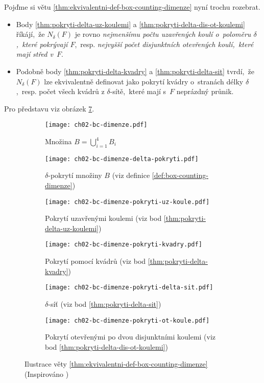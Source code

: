 Pojďme si větu \ref{thm:ekvivalentni-def-box-counting-dimenze} nyní trochu rozebrat.
\begin{itemize}
    \item Body \ref{thm:pokryti-delta-uz-koulemi} a \ref{thm:pokryti-delta-dis-ot-koulemi} říkájí,~že $N_\delta(F)$ je rovno \emph{nejmenšímu počtu uzavřených koulí o~poloměru $\delta$,~které pokrývají $F$},~resp. \emph{nejvyšší počet disjunktních otevřených koulí,~které mají střed v~$F$}.
    \item Podobně body \ref{thm:pokryti-delta-kvadry} a \ref{thm:pokryti-delta-sit} tvrdí,~že $N_\delta(F)$ lze ekvivalentně definovat jako pokrytí kvádry o~stranách délky $\delta$,~resp. počet všech kvádrů z $\delta$-sítě,~které mají s~$F$ neprázdný průnik.
\end{itemize}
Pro představu viz obrázek \ref{fig:ilustrace-definic-bc-dimenze}.
\begin{figure}[h]
    \centering
    \begin{subfigure}{0.4\textwidth}
        \centering
        \texttt{[image: ch02-bc-dimenze.pdf]}
        \caption{Množina $B=\bigcup_{i=1}^4 B_i$}
        \label{subfig:bc-dimenze-pokryvana-mnozina}
    \end{subfigure}
    \qquad
    \begin{subfigure}{0.4\textwidth}
        \centering
        \texttt{[image: ch02-bc-dimenze-delta-pokryti.pdf]}
        \caption{$\delta$-pokrytí množiny $B$ (viz definice \ref{def:box-counting-dimenze})}
        \label{subfig:bc-dimenze-delta-pokryti}
    \end{subfigure}
    \qquad
    \begin{subfigure}{0.4\textwidth}
        \centering
        \texttt{[image: ch02-bc-dimenze-pokryti-uz-koule.pdf]}
        \caption{Pokrytí uzavřenými koulemi (viz bod \ref{thm:pokryti-delta-uz-koulemi})}
        \label{subfig:bc-dimenze-uz-koule}
    \end{subfigure}
    \qquad
    \begin{subfigure}{0.4\textwidth}
        \centering
        \texttt{[image: ch02-bc-dimenze-pokryti-kvadry.pdf]}
        \caption{Pokrytí pomocí kvádrů (viz bod \ref{thm:pokryti-delta-kvadry})}
        \label{subfig:bc-dimenze-kvadry}
    \end{subfigure}
    \qquad
    \begin{subfigure}{0.4\textwidth}
        \centering
        \texttt{[image: ch02-bc-dimenze-pokryti-delta-sit.pdf]}
        \caption{$\delta$-síť (viz bod \ref{thm:pokryti-delta-sit})}
        \label{subfig:bc-dimenze-delta-sit}
    \end{subfigure}
    \qquad
    \begin{subfigure}{0.4\textwidth}
        \centering
        \texttt{[image: ch02-bc-dimenze-pokryti-ot-koule.pdf]}
        \caption{Pokrytí otevřenými po dvou disjunktními koulemi (viz bod \ref{thm:pokryti-delta-dis-ot-koulemi})}
        \label{subfig:bc-dimenze-ot-koule}
    \end{subfigure}
    \caption{Ilustrace věty \ref{thm:ekvivalentni-def-box-counting-dimenze} (Inspirováno \citep[str. 29]{Falconer2014})}
    \label{fig:ilustrace-definic-bc-dimenze}
\end{figure}

